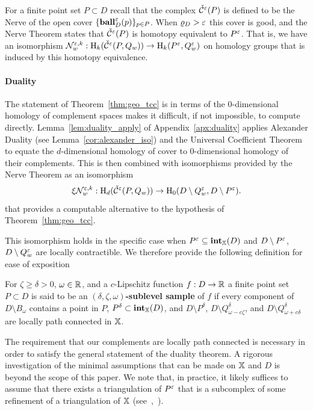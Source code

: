 
For a finite point set $P\subset D$ recall that the \Cech complex $\check{\mathcal{C}}^\varepsilon(P)$ is defined to be the Nerve of the open cover $\{\mathbf{ball}_D^\varepsilon(p)\}_{p\in P}$.
When $\varrho_D > \varepsilon$ this cover is good, and the Nerve Theorem states that $\check{\mathcal{C}}^\varepsilon(P)$ is homotopy equivalent to $P^\varepsilon$.
That is, we have an isomorphism $\mathcal{N}_w^{\varepsilon, k} : \mathrm{H}_k(\check{\mathcal{C}}^\varepsilon(P,Q_w))\to \mathrm{H}_k(P^\varepsilon, Q_w^\varepsilon)$ on homology groups that is induced by this homotopy equivalence.%

\paragraph{Duality}

The statement of Theorem~\ref{thm:geo_tcc} is in terms of the $0$-dimensional homology of complement spaces makes it difficult, if not impossible, to compute directly.
Lemma~\ref{lem:duality_apply} of Appendix~\ref{apx:duality} applies Alexander Duality (see Lemma~\ref{cor:alexander_iso}) and the Universal Coefficient Theorem to equate the $d$-dimensional homology of cover to $0$-dimensional homology of their complements.
This is then combined with isomorphisms provided by the Nerve Theorem as an isomorphism
\[ \xi\mathcal{N}_w^{\varepsilon,k} : \mathrm{H}_d(\check{\mathcal{C}}^\varepsilon(P,Q_w))\to \mathrm{H}_0(D\setminus Q_w^\varepsilon, D\setminus P^\varepsilon).\]
that provides a computable alternative to the hypothesis of Theorem~\ref{thm:geo_tcc}.

This isomorphism holds in the specific case when $P^\varepsilon\subseteq \mathbf{int}_{\mathbb{X}}(D)$ and $D\setminus P^\varepsilon$, $D\setminus Q_w^\varepsilon$ are locally contractible.
We therefore provide the following definition for ease of exposition
\begin{definition}
  For $\zeta\geq \delta > 0$, $\omega\in\mathbb{R}$, and a $c$-Lipschitz function $f: D\to \mathbb{R}$ a finite point set $P\subset D$ is said to be an \textbf{$(\delta, \zeta, \omega)$-sublevel sample} of $f$ if every component of $D\setminus B_\omega$ contains a point in $P$, $P^\delta\subset\mathbf{int}_{\mathbb{X}}(D)$, and $D\setminus P^\delta$, $D\setminus Q_{\omega-c\zeta}^\delta$, and $D\setminus Q_{\omega+c\delta}^\delta$ are locally path connected in $\mathbb{X}$.
\end{definition}

The requirement that our complements are locally path connected is necessary in order to satisfy the general statement of the duality theorem.
A rigorous investigation of the minimal assumptions that can be made on $\mathbb{X}$ and $D$ is beyond the scope of this paper.
We note that, in practice, it likely suffices to assume that there exists a triangulation of $P^\varepsilon$ that is a subcomplex of some refinement of a triangulation of $\mathbb{X}$ (see~\cite{cavanna2017when},~\cite{julian83alexander}).

